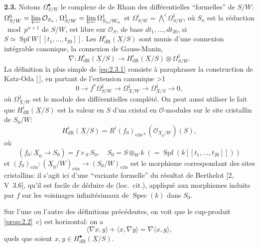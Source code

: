 \documentclass[10pt]{article}
\DeclareMathOperator{\Spf}{Spf}
\DeclareMathOperator{\Spec}{Spec}
\newcommand{\cris}{\mathrm{cris}}
\newcommand{\UX}{\underline{X}}
\newcommand{\DPage}[2]{\ifnum#1>1\clearpage\fi\setcounter{page}{#2}}
\begin{document}
\noindent\textbf{2.3.}
Notons $\Omega_{S/W}^{\bullet}$ le complexe de de Rham des différentielles ``formelles'' de $S/W$: $\Omega_{S/W}^{0} = \varprojlim \mathcal{O}_{S_n}$, $\Omega_{S/W}^{1} = \varprojlim \Omega^1_{S_n/W_n}$ et $\Omega^i_{S/W}=\bigwedge^i\Omega^1_{S/W}$, où $S_n$ est la réduction $\bmod p^{n+1}$ de $S/W$, est libre sur $\mathcal{O}_S$, de base $dt_1, \ldots, dt_{20}$, si $S \simeq \Spf W[[t_1, \ldots, t_{20}]]$. Les $H^i_{\mathrm{dR}}(\UX/S)$ sont munis d'une connexion intégrable canonique, la connexion de Gauss-Manin,
\begin{equation}\tag{2.3.1}\label{eq:2.3.1}
\nabla: H^i_{\mathrm{dR}}(\UX/S) \to H^i_{\mathrm{dR}}(\UX/S) \otimes \Omega^1_{S/W}.
\end{equation}
La définition la plus simple de \eqref{eq:2.3.1} consiste à paraphraser la construction de Katz-Oda [\,], en partant de l'extension canonique
\DPage{9}{66}
\begin{equation}\tag{2.3.0}\label{eq:2.3.0}
0 \to f^*\Omega^1_{S/W} \to \Omega^1_{\UX/W} \to \Omega^1_{\UX/S} \to 0,
\end{equation}
où $\Omega^1_{\UX/W}$ est le module des différentielles complété. On peut aussi utiliser le fait que $H^i_{\mathrm{dR}}(\UX/S)$ est la valeur en $S$ d'un cristal en $\mathcal{O}$-modules sur le site cristallin de $S_0/W$:
\begin{equation}\tag{2.3.2}\label{eq:2.3.2}
H^i_{\mathrm{dR}}(\UX/S) = R^i(f_0)_{\cris*}(\mathcal{O}_{\UX_0/W})(S),
\end{equation}
où
\begin{equation}\tag{2.3.2.1}\label{eq:2.3.2.1}
(f_0: \UX_0 \to S_0) = f \times_S S_0, \quad S_0 = S \otimes_W k \; (= \Spf(k[[t_1, \ldots, t_{20}]]))
\end{equation}
et $(f_0)_{\cris}: (\UX_0/W)_{\cris} \to (S_0/W)_{\cris}$ est le morphisme correspondant des sites cristallins: il s'agit ici d'une ``variante formelle'' du résultat de Berthelot [2, V~3.6], qu'il est facile de déduire de (loc.~cit.), appliqué aux morphismes induits par $f$ sur les voisinages infinitésimaux de $\Spec(k)$ dans $S_0$.

Sur l'une ou l'autre des définitions précédentes, on voit que le cup-produit \ref{prop:2.2}~c) est horizontal: on a
\begin{equation}\tag{2.3.3}\label{eq:2.3.3}
\langle \nabla x, y \rangle + \langle x, \nabla y \rangle = \nabla \langle x, y \rangle,
\end{equation}
quels que soient $x, y \in H^{\bullet}_{\mathrm{dR}}(\UX/S)$.
\end{document}
